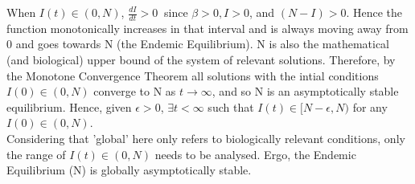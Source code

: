 When $I(t) \in (0,N)$,  $\frac{dI}{dt} >0\ $ since $\beta >0, I >0$, and $(N-I) >0$.
Hence the function monotonically increases in that interval and is always moving away from 0 and goes towards N (the Endemic Equilibrium).
N is also the mathematical (and biological) upper bound of the system of relevant solutions.
Therefore, by the Monotone Convergence Theorem all solutions with the intial conditions $I(0) \in (0,N)$ converge to N as $t\to\infty$, and so N is an asymptotically stable equilibrium.
Hence, given $\epsilon>0$, $\exists t<\infty$ such that $I(t) \in [N-\epsilon, N)$ for any $I(0) \in (0,N)$.\\
Considering that 'global' here only refers to biologically relevant conditions, only the range of $I(t) \in (0,N)$ needs to be analysed.
Ergo, the Endemic Equilibrium (N) is globally asymptotically stable.

